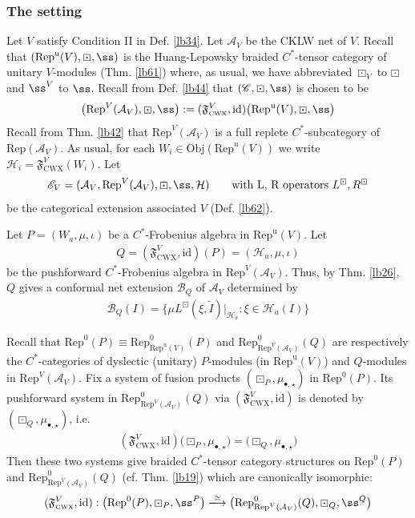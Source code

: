 \documentclass[11pt,b5paper,notitlepage]{article}
\theoremstyle{definition}
\theoremstyle{plain}
\newcommand{\fk}{\mathfrak}
\newcommand{\mc}{\mathcal}
\newcommand{\wtd}{\widetilde}
\newcommand{\id}{\mathrm{id}}
\newcommand{\Rep}{\mathrm{Rep}}
\newcommand{\uni}{\mathrm{u}}
\newcommand{\scr}{\mathscr}
\newcommand{\RepV}{{\mathrm{Rep}^\uni(V)}}
\newcommand{\blt}{\bullet}
\newcommand{\Obj}{\mathrm{Obj}}
\newcommand{\CWX}{{\scriptscriptstyle \mathrm{CWX}}}
\numberwithin{equation}{section}
\begin{document}
\subsubsection{The setting}\label{lb74}
Let $V$ satisfy Condition II in Def. \ref{lb34}. Let $\mc A_V$ be the CKLW net of $V$. Recall that $(\RepV,\boxdot,\ss)$ is the Huang-Lepowsky braided $C^*$-tensor category of unitary $V$-modules (Thm. \ref{lb61}) where, as usual, we have abbreviated $\boxdot_V$ to $\boxdot$ and $\ss^V$ to $\ss$. Recall from Def. \ref{lb44} that $(\scr C,\boxdot,\ss)$ is chosen to be
\begin{align*}
\big(\Rep^V(\mc A_V),\boxdot,\ss\big):=(\fk F^V_\CWX,\id)\big(\RepV,\boxdot,\ss\big)
\end{align*}
Recall from Thm. \ref{lb42} that $\Rep^V(\mc A_V)$ is a full replete $C^*$-subcategory of $\Rep(\mc A_V)$. As usual, for each $W_i\in\Obj(\RepV)$ we write $\mc H_i=\fk F_\CWX^V(W_i)$. Let
\begin{align*}
\scr E_V=(\mc A_V,\Rep^V(\mc A_V),\boxdot,\ss,\mc H)\qquad\text{with L, R operators }L^\boxdot,R^\boxdot
\end{align*}
be the categorical extension associated $V$ (Def. \ref{lb62}).

Let $P=(W_a,\mu,\iota)$ be a $C^*$-Frobenius algebra in $\RepV$. Let
\begin{align*}
Q=(\fk F^V_\CWX,\id)(P)=(\mc H_a,\mu,\iota)
\end{align*}
be the pushforward $C^*$-Frobenius algebra in $\Rep^V(\mc A_V)$. Thus, by Thm. \ref{lb26}, $Q$ gives a conformal net extension $\mc B_Q$ of $\mc A_V$ determined by
\begin{align}\label{eq77}
\mc B_Q(I)=\{\mu L^\boxdot(\xi,\wtd I)|_{\mc H_a}:\xi\in\mc H_a(I)\}
\end{align}

Recall that $\Rep^0(P)\equiv\Rep^0_\RepV(P)$ and $\Rep^0_{\Rep^V(\mc A_V)}(Q)$ are respectively the $C^*$-categories of dyslectic (unitary) $P$-modules (in $\RepV$) and $Q$-modules in $\Rep^V(\mc A_V)$. Fix a system of fusion products $(\boxdot_P,\mu_{\blt,\star})$ in $\Rep^0(P)$. Its pushforward system in $\Rep^0_{\Rep^V(\mc A_V)}(Q)$ via $(\fk F_\CWX^V,\id)$ is denoted by $(\boxdot_Q,\mu_{\blt,\star})$, i.e.
\begin{align*}
(\fk F_\CWX^V,\id)\big(\boxdot_P,\mu_{\blt,\star}\big)=\big(\boxdot_Q,\mu_{\blt,\star}\big)
\end{align*}
Then these two systems give braided $C^*$-tensor category structures on $\Rep^0(P)$ and $\Rep^0_{\Rep^V(\mc A_V)}(Q)$ (cf. Thm. \ref{lb19}) which are canonically isomorphic:
\begin{align}
(\fk F^V_\CWX,\id):\big(\Rep^0(P),\boxdot_P,\ss^P\big)\xlongrightarrow{\simeq} \big(\Rep^0_{\Rep^V(\mc A_V)}(Q),\boxdot_Q,\ss^Q\big)
\end{align}
\end{document}
